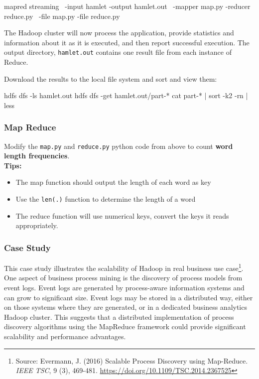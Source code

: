 \begin{withcode}
\begin{bashcode}
mapred streaming \
  -input hamlet -output hamlet.out \
  -mapper map.py -reducer reduce.py \
  -file map.py -file reduce.py
\end{bashcode}

The Hadoop cluster will now process the application, provide statistics and information about it as it is executed, and then report successful execution. The output directory, \texttt{hamlet.out} contains one result file from each instance of Reduce. 

Download the results to the local file system and sort and view them:

\begin{bashcode}
hdfs dfs -ls hamlet.out
hdfs dfs -get hamlet.out/part-*
cat part-* | sort -k2 -rn | less
\end{bashcode}

\begin{exerciseboxcomputer}

\subsubsection*{Map Reduce}

Modify the \texttt{map.py} and \texttt{reduce.py} python code from above to count \textbf{word length frequencies}. \\

\vspace{\baselineskip}
\textbf{Tips:}
\begin{itemize}
   \item The map function should output the length of each word as key
   \item Use the \texttt{len(.)} function to determine the length of a word
   
   \item The reduce function will use numerical keys, convert the keys it reads appropriately.
\end{itemize}
\end{exerciseboxcomputer}
\end{withcode}

\subsubsection*{Case Study}

This case study illustrates the scalability of Hadoop in real business use case\footnote{Source: Evermann, J. (2016) Scalable Process Discovery using Map-Reduce. \emph{IEEE TSC}, 9 (3), 469-481. \url{https://doi.org/10.1109/TSC.2014.2367525}}. One aspect of business process mining is the discovery of process models from event logs. Event logs are generated by process-aware information systems and can grow to significant size. Event logs may be stored in a distributed way, either on those systems where they are generated, or in a dedicated business analytics Hadoop cluster. This suggests that a distributed implementation of process discovery algorithms using the MapReduce framework could provide significant scalability and performance advantages. 

